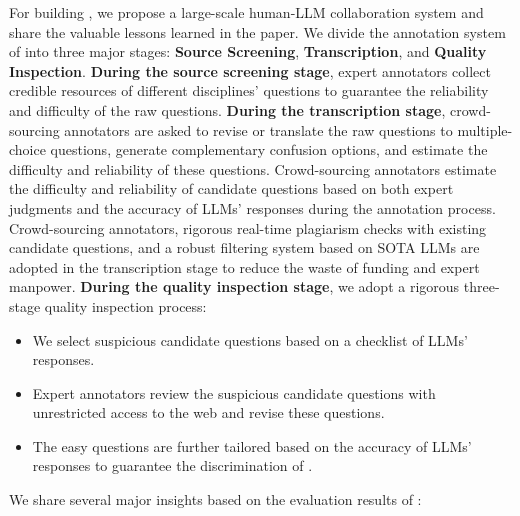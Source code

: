 For building \benchmark, we propose a large-scale human-LLM collaboration system and share the valuable lessons learned in the paper.
We divide the annotation system of \benchmark into three major stages: \textbf{Source Screening}, \textbf{Transcription}, and \textbf{Quality Inspection}.
\textbf{During the source screening stage}, expert annotators collect credible resources of different disciplines' questions to guarantee the reliability and difficulty of the raw questions.
\textbf{During the transcription stage}, crowd-sourcing annotators are asked to revise or translate the raw questions to multiple-choice questions, generate complementary confusion options, and estimate the difficulty and reliability of these questions.
Crowd-sourcing annotators estimate the difficulty and reliability of candidate questions based on both expert judgments and the accuracy of LLMs' responses during the annotation process.
Crowd-sourcing annotators, rigorous real-time plagiarism checks with existing candidate questions, and a robust filtering system based on SOTA LLMs are adopted in the transcription stage to reduce the waste of funding and expert manpower.
\textbf{During the quality inspection stage}, we adopt a rigorous three-stage quality inspection process:
\begin{itemize}
    \item We select suspicious candidate questions based on a checklist of LLMs' responses. 
    \item Expert annotators review the suspicious candidate questions with unrestricted access to the web and revise these questions.
    \item The easy questions are further tailored based on the accuracy of LLMs' responses to guarantee the discrimination of \benchmark.
\end{itemize}


We share several major insights based on the evaluation results of \benchmark:


